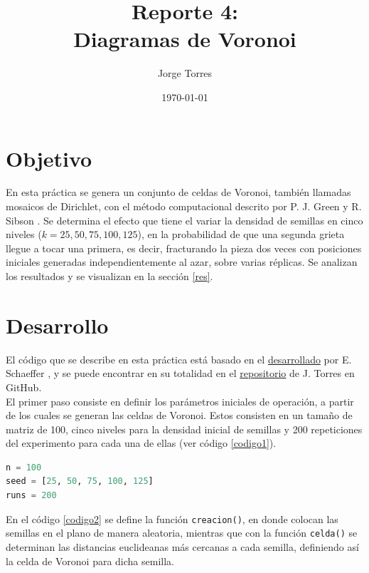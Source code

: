 \documentclass{article}
\title{Reporte 4:\\Diagramas de Voronoi}
\author{Jorge Torres}
\date{\today}
\begin{document}
\maketitle

\section{Objetivo}
En esta pr\'actica se genera un conjunto de celdas de Voronoi, tambi\'en llamadas mosaicos de Dirichlet, con el m\'etodo computacional descrito por P. J. Green y R. Sibson \cite{green}. Se determina el efecto que tiene el variar la densidad de semillas en cinco niveles ($k = 25, 50, 75, 100, 125$), en la probabilidad de que una segunda grieta llegue a tocar una primera, es decir, fracturando la pieza dos veces con posiciones iniciales generadas independientemente al azar, sobre varias réplicas. Se analizan los resultados y se visualizan en la secci\'on \ref{res}.

\section{Desarrollo}
El c\'odigo que se describe en esta pr\'actica est\'a basado en el \href{https://github.com/satuelisa/Simulation/blob/master/VoronoiDiagrams/fracture.py}{desarrollado} por E. Schaeffer \cite{elisa1}, y se puede encontrar en su totalidad en el \href{https://github.com/FeroxDeitas/Simulacion-Nano/blob/main/Tareas/P4/voronoi.py}{repositorio} de J. Torres en GitHub.\\

El primer paso consiste en definir los par\'ametros iniciales de operaci\'on, a partir de los cuales se generan las celdas de Voronoi. Estos consisten en un tamaño de matriz de 100, cinco niveles para la densidad inicial de semillas y 200 repeticiones del experimento para cada una de ellas (ver c\'odigo \ref{codigo1}).

\begin{lstlisting}[caption=Par\'ametros, label=codigo1, language=Python]
n = 100
seed = [25, 50, 75, 100, 125]
runs = 200
\end{lstlisting}

En el c\'odigo \ref{codigo2} se define la funci\'on \texttt{creacion()}, en donde colocan las semillas en el plano de manera aleatoria, mientras que con la funci\'on \texttt{celda()} se determinan las distancias euclideanas m\'as cercanas a cada semilla, definiendo as\'i la celda de Voronoi para dicha semilla.
\end{document}
